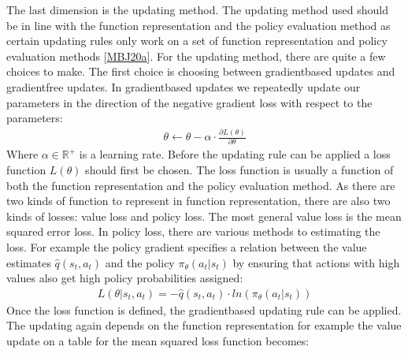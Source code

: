 \documentclass[letterpaper,10pt,english]{jupyterBook}
\begin{document}
\sphinxAtStartPar
The last dimension is the updating method. The updating method used should be in line with the function representation and the policy evaluation method as certain updating rules only work on a set of function representation and policy evaluation methods {[}\hyperlink{cite.Discussion:id7}{MBJ20a}{]}. For the updating method, there are quite a few choices to make. The first choice is choosing between gradient\sphinxhyphen{}based updates and gradient\sphinxhyphen{}free updates. In gradient\sphinxhyphen{}based updates we repeatedly update our parameters in the direction of the negative gradient loss with respect to the parameters:
\begin{equation*}
\begin{split} \theta \leftarrow \theta - \alpha \cdot \frac{\partial L(\theta)}{\partial \theta} \end{split}
\end{equation*}
\sphinxAtStartPar
Where \(\alpha \in \mathbb{R}^+\) is a learning rate. Before the updating rule can be applied a loss function \(L(\theta)\) should first be chosen. The loss function is usually a function of both the function representation and the policy evaluation method. As there are two kinds of function to represent in function representation, there are also two kinds of losses: value loss and policy loss. The most general value loss is the mean squared error loss. In policy loss, there are various methods to estimating the loss. For example the policy gradient specifies a relation between the value estimates \(\hat{q}(s_t,a_t)\) and the policy \(\pi_{\theta}(a_t|s_t)\) by ensuring that actions with high values also get high policy probabilities assigned:
\begin{equation*}
\begin{split}L(\theta|s_t, a_t) = -\hat{q}(s_t,a_t) \cdot ln (\pi_{\theta}(a_t|s_t))\end{split}
\end{equation*}
\sphinxAtStartPar
Once the loss function is defined, the gradient\sphinxhyphen{}based updating rule can be applied. The updating again depends on the function representation for example the value update on a table for the mean squared loss function becomes:
\end{document}
